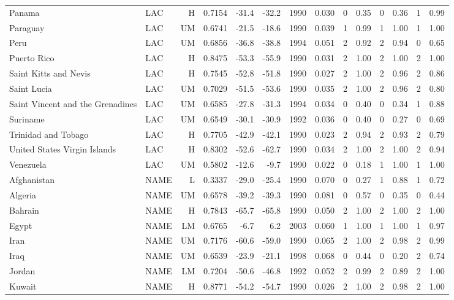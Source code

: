 \begin{longtable}{llrrrrrrrrrrrr}
Panama & LAC & H & 0.7154 & -31.4 & -32.2 & 1990 & 0.030 & 0 & 0.35 & 0 & 0.36 & 1 & 0.99 \\
Paraguay & LAC & UM & 0.6741 & -21.5 & -18.6 & 1990 & 0.039 & 1 & 0.99 & 1 & 1.00 & 1 & 1.00 \\
Peru & LAC & UM & 0.6856 & -36.8 & -38.8 & 1994 & 0.051 & 2 & 0.92 & 2 & 0.94 & 0 & 0.65 \\
Puerto Rico & LAC & H & 0.8475 & -53.3 & -55.9 & 1990 & 0.031 & 2 & 1.00 & 2 & 1.00 & 2 & 1.00 \\
Saint Kitts and Nevis & LAC & H & 0.7545 & -52.8 & -51.8 & 1990 & 0.027 & 2 & 1.00 & 2 & 0.96 & 2 & 0.86 \\
Saint Lucia & LAC & UM & 0.7029 & -51.5 & -53.6 & 1990 & 0.035 & 2 & 1.00 & 2 & 0.96 & 2 & 0.80 \\
Saint Vincent and the Grenadines & LAC & UM & 0.6585 & -27.8 & -31.3 & 1994 & 0.034 & 0 & 0.40 & 0 & 0.34 & 1 & 0.88 \\
Suriname & LAC & UM & 0.6549 & -30.1 & -30.9 & 1992 & 0.036 & 0 & 0.40 & 0 & 0.27 & 0 & 0.69 \\
Trinidad and Tobago & LAC & H & 0.7705 & -42.9 & -42.1 & 1990 & 0.023 & 2 & 0.94 & 2 & 0.93 & 2 & 0.79 \\
United States Virgin Islands & LAC & H & 0.8302 & -52.6 & -62.7 & 1990 & 0.034 & 2 & 1.00 & 2 & 1.00 & 2 & 0.94 \\
Venezuela & LAC & UM & 0.5802 & -12.6 &  -9.7 & 1990 & 0.022 & 0 & 0.18 & 1 & 1.00 & 1 & 1.00 \\
Afghanistan & NAME & L & 0.3337 & -29.0 & -25.4 & 1990 & 0.070 & 0 & 0.27 & 1 & 0.88 & 1 & 0.72 \\
Algeria & NAME & UM & 0.6578 & -39.2 & -39.3 & 1990 & 0.081 & 0 & 0.57 & 0 & 0.35 & 0 & 0.44 \\
Bahrain & NAME & H & 0.7843 & -65.7 & -65.8 & 1990 & 0.050 & 2 & 1.00 & 2 & 1.00 & 2 & 1.00 \\
Egypt & NAME & LM & 0.6765 &  -6.7 &   6.2 & 2003 & 0.060 & 1 & 1.00 & 1 & 1.00 & 1 & 0.97 \\
Iran & NAME & UM & 0.7176 & -60.6 & -59.0 & 1990 & 0.065 & 2 & 1.00 & 2 & 0.98 & 2 & 0.99 \\
Iraq & NAME & UM & 0.6539 & -23.9 & -21.1 & 1998 & 0.068 & 0 & 0.44 & 0 & 0.20 & 2 & 0.74 \\
Jordan & NAME & LM & 0.7204 & -50.6 & -46.8 & 1992 & 0.052 & 2 & 0.99 & 2 & 0.89 & 2 & 1.00 \\
Kuwait & NAME & H & 0.8771 & -54.2 & -54.7 & 1990 & 0.026 & 2 & 1.00 & 2 & 0.98 & 2 & 1.00 \\

\end{longtable}
